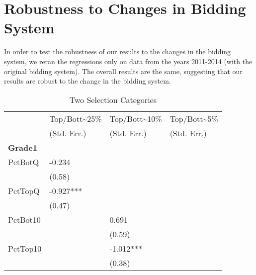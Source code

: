 \clearpage{}

\section{Robustness to Changes in Bidding System}\label{appendix:d}

In order to test the robustness of our results to the changes in the bidding system, we reran the regressions only on data from the years 2011-2014 (with the original bidding system). 
The overall results are the same, suggesting that our results are robust to the change in the bidding system. 
\bigskip
\begin{table}[htb]
  \centering
  \begin{threeparttable}
    \caption{Two Selection Categories}\label{tab:d1}
    \begin{tabular}{l l l l} 
      \hline
      \hline
                      & Top/Bott{\textasciitilde}25\% & Top/Bott{\textasciitilde}10\% & Top/Bott{\textasciitilde}5\% \\
                      & (Std. Err.)                   & (Std. Err.)                   & (Std. Err.)                  \\
      \hline
      \textbf{Grade1} &                               &                               &                              \\
      PctBotQ         & -0.234                        &                               &                              \\
                      & (0.58)                        &                               &                              \\
      PctTopQ         & -0.927***                     &                               &                              \\
                      & (0.47)                        &                               &                              \\
      PctBot10        &                               & 0.691                         &                              \\
                      &                               & (0.59)                        &                              \\
      PctTop10        &                               & -1.012***                     &                              \\
                      &                               & (0.38)                        &                              \\

\end{tabular}
\end{threeparttable}
\end{table}
